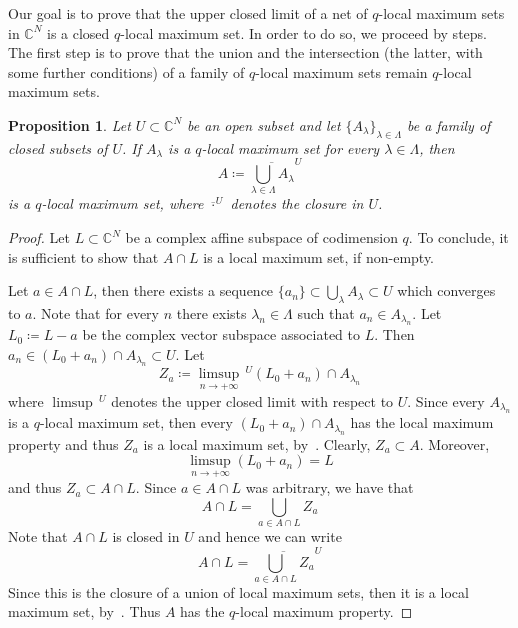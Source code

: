 \documentclass[reqno,oneside]{amsart}
\newcommand{\numberset}{\mathbb}
\newcommand{\C}{\numberset{C}}
\theoremstyle{definition}
\theoremstyle{plain}
\newtheorem{proposition}[definition]{Proposition}
\theoremstyle{remark}
\begin{document}
Our goal is to prove that the upper closed limit of a net of $q$-local maximum sets in $\C^N$ is a closed $q$-local maximum set. In order to do so, we proceed by steps. The first step is to prove that the union and the intersection (the latter, with some further conditions) of a family of $q$-local maximum sets remain $q$-local maximum sets.
\begin{proposition}
\label{prop:union}
	Let $U\subset\C^N$ be an open subset and let $\{A_\lambda\}_{\lambda\in\Lambda}$ be a family of closed subsets of $U$. If $A_\lambda$ is a $q$-local maximum set for every $\lambda\in\Lambda$, then
	\[
		A\coloneqq\overline{\bigcup_{\lambda\in\Lambda}A_\lambda}^U
	\]
	is a $q$-local maximum set, where $\overline{\cdot}^U$ denotes the closure in $U$.
\end{proposition}
\begin{proof}
	Let $L\subset\C^N$ be a complex affine subspace of codimension $q$. To conclude, it is sufficient to show that $A\cap L$ is a local maximum set, if non-empty.
	
	Let $a\in A\cap L$, then there exists a sequence $\{a_n\}\subset\bigcup_{\lambda} A_\lambda\subset U$ which converges to $a$. Note that for every $n$ there exists $\lambda_n\in\Lambda$ such that $a_n\in A_{\lambda_n}$. Let $L_0\coloneqq L-a$ be the complex vector subspace associated to $L$. Then $a_n\in(L_0+a_n)\cap A_{\lambda_n}\subset U$. Let
	\[
		Z_a\coloneqq\limsup_{n\to+\infty}\,\!\!^U(L_0+a_n)\cap A_{\lambda_n}
	\]
	where $\limsup\,\!\!^U$ denotes the upper closed limit with respect to $U$. Since every $A_{\lambda_n}$ is a $q$-local maximum set, then every $(L_0+a_n)\cap A_{\lambda_n}$ has the local maximum property and thus $Z_a$ is a local maximum set, by~\cite[Proposition~1.2(d)]{slodkowski:pseudoconcave}. Clearly, $Z_a\subset A$. Moreover,
	\[
		\limsup_{n\to+\infty}(L_0+a_n)=L
	\]
	and thus $Z_a\subset A\cap L$. Since $a\in A\cap L$ was arbitrary, we have that
	\[
		A\cap L=\bigcup_{a\in A\cap L} Z_a
	\]
	Note that $A\cap L$ is closed in $U$ and hence we can write
	\[
		A\cap L=\overline{\bigcup_{a\in A\cap L} Z_a}^U
	\]
	Since this is the closure of a union of local maximum sets, then it is a local maximum set, by~\cite[Proposition~1.2(e)]{slodkowski:pseudoconcave}. Thus $A$ has the $q$-local maximum property.
\end{proof}
\end{document}
